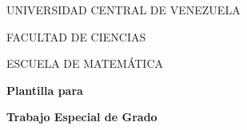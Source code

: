 
\thispagestyle{empty}


\begin{center}

\vspace*{-1.5cm}


\vspace{.5cm}

\begin{small}
UNIVERSIDAD CENTRAL DE VENEZUELA

\vspace{-0.1cm}

FACULTAD DE CIENCIAS

\vspace{-0.1cm}

ESCUELA DE MATEM\'ATICA

\vspace{-0.1cm}

\end{small}

\vspace{4cm}

\begin{Huge}

{\bf Plantilla para}

{\bf Trabajo Especial de Grado}


\end{Huge}

\end{center}

